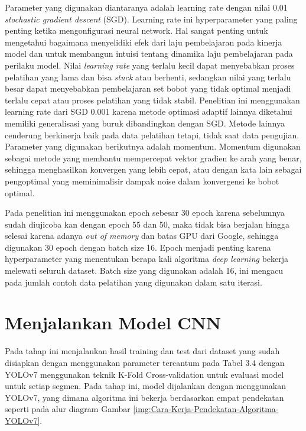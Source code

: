 Parameter yang digunakan diantaranya adalah learning rate dengan nilai 0.01 \textit{stochastic gradient descent} (SGD). Learning rate ini hyperparameter yang paling penting ketika mengonfigurasi neural network. Hal sangat penting untuk mengetahui bagaimana menyelidiki efek dari laju pembelajaran pada kinerja model dan untuk membangun intuisi tentang dinamika laju pembelajaran pada perilaku model. Nilai \textit{learning rate} yang terlalu kecil dapat menyebabkan proses pelatihan yang lama dan bisa \textit{stuck} atau berhenti, sedangkan nilai yang terlalu besar dapat menyebabkan pembelajaran set bobot yang tidak optimal menjadi terlalu cepat atau proses pelatihan yang tidak stabil. Penelitian ini menggunakan learning rate dari SGD 0.001 karena metode optimasi adaptif lainnya diketahui memiliki generalisasi yang buruk dibandingkan dengan SGD. Metode lainnya cenderung berkinerja baik pada data pelatihan tetapi, tidak saat data pengujian. Parameter yang digunakan berikutnya adalah momentum. Momentum digunakan sebagai metode yang membantu mempercepat vektor gradien ke arah yang benar, sehingga menghasilkan konvergen yang lebih cepat, atau dengan kata lain sebagai pengoptimal yang meminimalisir dampak noise dalam konvergensi ke bobot optimal.

Pada penelitian ini menggunakan epoch sebesar 30 epoch karena sebelumnya sudah diujicoba kan dengan epoch 55 dan 50, maka tidak bisa berjalan hingga selesai karena adanya \textit{out of memory} dan batas GPU dari Google, sehingga digunakan 30 epoch dengan batch size 16. Epoch menjadi penting karena hyperparameter yang menentukan berapa kali algoritma \textit{deep learning} bekerja melewati seluruh dataset. Batch size yang digunakan adalah 16, ini mengacu pada jumlah contoh data pelatihan yang digunakan dalam satu iterasi.

\section{Menjalankan Model CNN}
\hspace{1,2cm}Pada tahap ini menjalankan hasil training dan test dari dataset yang sudah disiapkan dengan menggunakan parameter tercantum pada Tabel 3.4 dengan YOLOv7 menggunakan teknik K-Fold Cross-validation untuk evaluasi model untuk setiap segmen. Pada tahap ini, model dijalankan dengan menggunakan YOLOv7, yang dimana algoritma ini bekerja berdasarkan empat pendekatan seperti pada alur diagram Gambar \ref{img:Cara-Kerja-Pendekatan-Algoritma-YOLOv7}.

